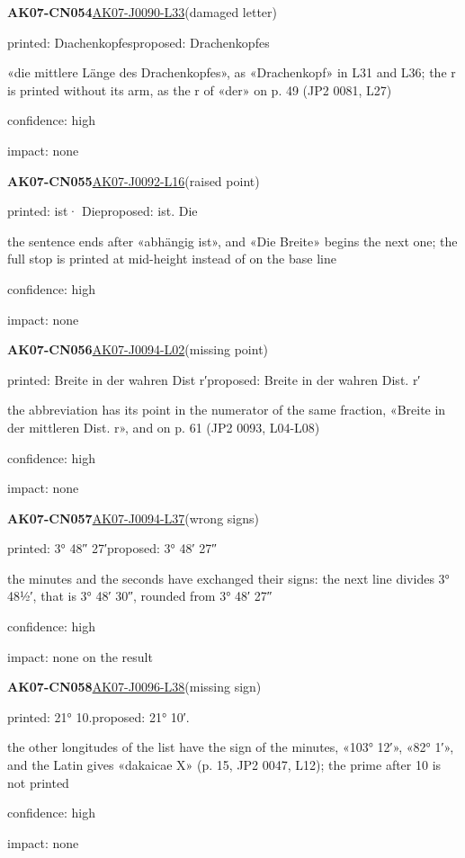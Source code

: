 \documentclass[11pt]{article}
\begin{document}
\noindent\textbf{AK07-CN054}\enspace\hyperlink{AK07-J0090-L33}{AK07-J0090-L33}\enspace(damaged letter)\par\noindent printed: Dıachenkopfes\enspace proposed: Drachenkopfes\par\noindent «die mittlere Länge des Drachenkopfes», as «Drachenkopf» in L31 and L36; the r is printed without its arm, as the r of «der» on p. 49 (JP2 0081, L27)\par\noindent confidence: high\par\noindent impact: none\par\medskip
\noindent\textbf{AK07-CN055}\enspace\hyperlink{AK07-J0092-L16}{AK07-J0092-L16}\enspace(raised point)\par\noindent printed: ist· Die\enspace proposed: ist. Die\par\noindent the sentence ends after «abhängig ist», and «Die Breite» begins the next one; the full stop is printed at mid-height instead of on the base line\par\noindent confidence: high\par\noindent impact: none\par\medskip
\noindent\textbf{AK07-CN056}\enspace\hyperlink{AK07-J0094-L02}{AK07-J0094-L02}\enspace(missing point)\par\noindent printed: Breite in der wahren Dist r′\enspace proposed: Breite in der wahren Dist. r′\par\noindent the abbreviation has its point in the numerator of the same fraction, «Breite in der mittleren Dist. r», and on p. 61 (JP2 0093, L04-L08)\par\noindent confidence: high\par\noindent impact: none\par\medskip
\noindent\textbf{AK07-CN057}\enspace\hyperlink{AK07-J0094-L37}{AK07-J0094-L37}\enspace(wrong signs)\par\noindent printed: 3° 48″ 27′\enspace proposed: 3° 48′ 27″\par\noindent the minutes and the seconds have exchanged their signs: the next line divides 3° 48½′, that is 3° 48′ 30″, rounded from 3° 48′ 27″\par\noindent confidence: high\par\noindent impact: none on the result\par\medskip
\noindent\textbf{AK07-CN058}\enspace\hyperlink{AK07-J0096-L38}{AK07-J0096-L38}\enspace(missing sign)\par\noindent printed: 21° 10.\enspace proposed: 21° 10′.\par\noindent the other longitudes of the list have the sign of the minutes, «103° 12′», «82° 1′», and the Latin gives «dakaicae X» (p. 15, JP2 0047, L12); the prime after 10 is not printed\par\noindent confidence: high\par\noindent impact: none\par\medskip
\end{document}
